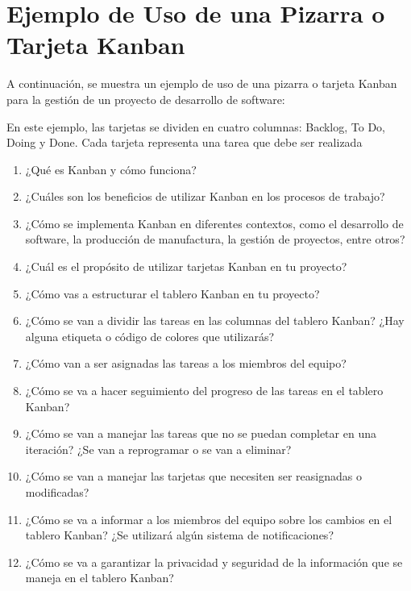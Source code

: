 \documentclass[../main]{subfiles}
\begin{document}
\section{Ejemplo de Uso de una Pizarra o Tarjeta Kanban}

A continuación, se muestra un ejemplo de uso de una pizarra o tarjeta Kanban para la gestión de un proyecto de desarrollo de software:


En este ejemplo, las tarjetas se dividen en cuatro columnas: Backlog, To Do, Doing y Done. Cada tarjeta representa una tarea que debe ser realizada



\begin{enumerate}
    \item ¿Qué es Kanban y cómo funciona?
\item ¿Cuáles son los beneficios de utilizar Kanban en los procesos de trabajo?
\item ¿Cómo se implementa Kanban en diferentes contextos, como el desarrollo de software, la producción de manufactura, la gestión de proyectos, entre otros?
\item ¿Cuál es el propósito de utilizar tarjetas Kanban en tu proyecto?
\item ¿Cómo vas a estructurar el tablero Kanban en tu proyecto? 
\item ¿Cómo se van a dividir las tareas en las columnas del tablero Kanban? ¿Hay alguna etiqueta o código de colores que utilizarás?
\item ¿Cómo van a ser asignadas las tareas a los miembros del equipo?
\item ¿Cómo se va a hacer seguimiento del progreso de las tareas en el tablero Kanban?
\item ¿Cómo se van a manejar las tareas que no se puedan completar en una iteración? ¿Se van a reprogramar o se van a eliminar?
\item ¿Cómo se van a manejar las tarjetas que necesiten ser reasignadas o modificadas?
\item ¿Cómo se va a informar a los miembros del equipo sobre los cambios en el tablero Kanban? ¿Se utilizará algún sistema de notificaciones?
\item ¿Cómo se va a garantizar la privacidad y seguridad de la información que se maneja en el tablero Kanban?

\end{enumerate}
\end{document}
